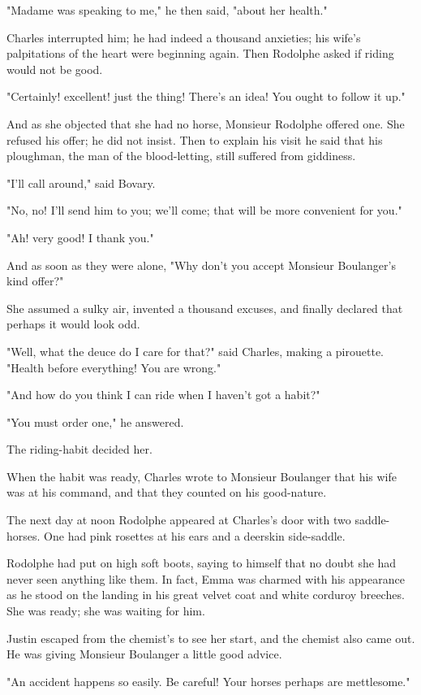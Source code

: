 \documentclass[11pt,twocolumn]{ltugboat}
\begin{document}
"Madame was speaking to me," he then said, "about her health."

Charles interrupted him; he had indeed a thousand anxieties; his wife's
palpitations of the heart were beginning again. Then Rodolphe asked if
riding would not be good.

"Certainly! excellent! just the thing! There's an idea! You ought to
follow it up."

And as she objected that she had no horse, Monsieur Rodolphe offered
one. She refused his offer; he did not insist. Then to explain his visit
he said that his ploughman, the man of the blood-letting, still suffered
from giddiness.

"I'll call around," said Bovary.

"No, no! I'll send him to you; we'll come; that will be more convenient
for you."

"Ah! very good! I thank you."

And as soon as they were alone, "Why don't you accept Monsieur
Boulanger's kind offer?"

She assumed a sulky air, invented a thousand excuses, and finally
declared that perhaps it would look odd.

"Well, what the deuce do I care for that?" said Charles, making a
pirouette. "Health before everything! You are wrong."

"And how do you think I can ride when I haven't got a habit?"

"You must order one," he answered.

The riding-habit decided her.

When the habit was ready, Charles wrote to Monsieur Boulanger that his
wife was at his command, and that they counted on his good-nature.

The next day at noon Rodolphe appeared at Charles's door with two
saddle-horses. One had pink rosettes at his ears and a deerskin
side-saddle.

Rodolphe had put on high soft boots, saying to himself that no doubt she
had never seen anything like them. In fact, Emma was charmed with his
appearance as he stood on the landing in his great velvet coat and white
corduroy breeches. She was ready; she was waiting for him.

Justin escaped from the chemist's to see her start, and the chemist also
came out. He was giving Monsieur Boulanger a little good advice.

"An accident happens so easily. Be careful! Your horses perhaps are
mettlesome."
\end{document}
